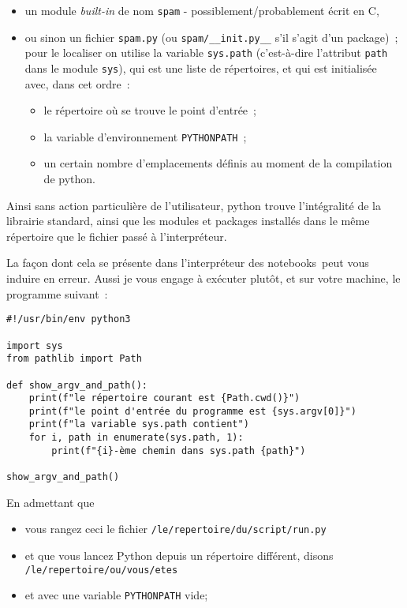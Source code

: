 \begin{itemize}
\tightlist
\item
  un module \emph{built-in} de nom \texttt{spam} -
  possiblement/probablement écrit en C,
\item
  ou sinon un fichier \texttt{spam.py} (ou \texttt{spam/\_\_init.py\_\_}
  s'il s'agit d'un package)~; pour le localiser on utilise la variable
  \texttt{sys.path} (c'est-à-dire l'attribut \texttt{path} dans le
  module \texttt{sys}), qui est une liste de répertoires, et qui est
  initialisée avec, dans cet ordre~:

  \begin{itemize}
  \tightlist
  \item
    le répertoire où se trouve le point d'entrée~;
  \item
    la variable d'environnement \texttt{PYTHONPATH}~;
  \item
    un certain nombre d'emplacements définis au moment de la compilation
    de python.
  \end{itemize}
\end{itemize}

    Ainsi sans action particulière de l'utilisateur, python trouve
l'intégralité de la librairie standard, ainsi que les modules et
packages installés dans le même répertoire que le fichier passé à
l'interpréteur.

    La façon dont cela se présente dans l'interpréteur des notebooks~peut
vous induire en erreur. Aussi je vous engage à exécuter plutôt, et sur
votre machine, le programme suivant~:

    \begin{verbatim}
#!/usr/bin/env python3

import sys
from pathlib import Path

def show_argv_and_path():
    print(f"le répertoire courant est {Path.cwd()}")
    print(f"le point d'entrée du programme est {sys.argv[0]}")
    print(f"la variable sys.path contient")
    for i, path in enumerate(sys.path, 1):
        print(f"{i}-ème chemin dans sys.path {path}")

show_argv_and_path()
\end{verbatim}

    En admettant que

\begin{itemize}
\tightlist
\item
  vous rangez ceci le fichier \texttt{/le/repertoire/du/script/run.py}
\item
  et que vous lancez Python depuis un répertoire différent, disons
  \texttt{/le/repertoire/ou/vous/etes}
\item
  et avec une variable \texttt{PYTHONPATH} vide;
\end{itemize}


